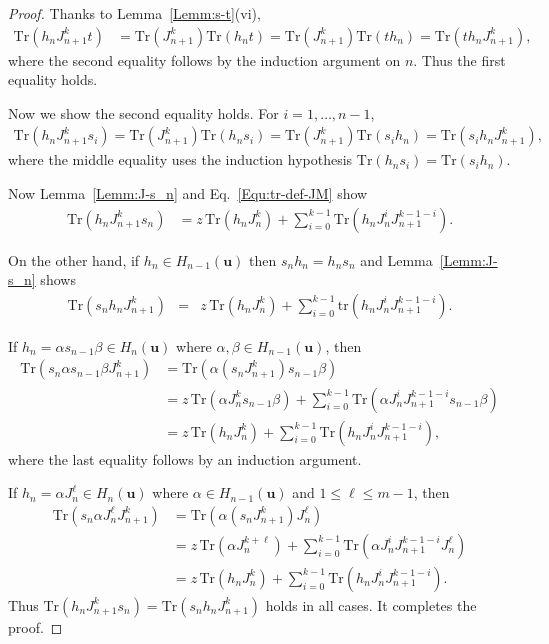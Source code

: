 \documentclass[a4paper, oneside]{amsart}
\numberwithin{equation}{section}
\theoremstyle{definition}
\theoremstyle{remark}
\begin{document}
\begin{proof}Thanks to Lemma~\ref{Lemm:s-t}(vi),
\begin{align*}
\mathrm{Tr}(h_{n}J_{n+1}^kt)&=\mathrm{Tr}(J_{n+1}^k)\mathrm{Tr}(h_{n}t)=\mathrm{Tr}(J_{n+1}^k)
\mathrm{Tr}(th_{n})=\mathrm{Tr}(th_{n}J_{n+1}^k),
\end{align*}
where the second equality follows by the induction argument on $n$.  Thus  the first equality holds.

Now we show the second equality holds.
For  $i=1, \ldots, n-1$,  \begin{align*}
\mathrm{Tr}(h_{n}J_{n+1}^ks_i)=\mathrm{Tr}(J_{n+1}^k)\mathrm{Tr}(h_{n}s_i)
=\mathrm{Tr}(J_{n+1}^k)\mathrm{Tr}(s_ih_{n})
=\mathrm{Tr}(s_ih_{n}J_{n+1}^k),
\end{align*}
where the middle equality uses the induction hypothesis $\mathrm{Tr}(h_{n}s_i)=\mathrm{Tr}(s_ih_{n})$.

Now Lemma~\ref{Lemm:J-s_n} and Eq.~\eqref{Equ:tr-def-JM} show
\begin{align*}
\mathrm{Tr}(h_{n}J_{n+1}^ks_n)&=z\,\mathrm{Tr}(h_{n}J_n^{k})+
\sum_{i=0}^{k-1}\mathrm{Tr}(h_nJ_{n}^iJ_{n+1}^{k-1-i}).
\end{align*}

On the other hand,  if $h_{n}\in H_{n-1}(\boldsymbol{u})$ then $s_nh_n=h_ns_n$ and Lemma~\ref{Lemm:J-s_n} shows \begin{eqnarray*}
\mathrm{Tr}(s_nh_{n}J_{n+1}^k)&=&z\,\mathrm{Tr}(h_{n}J_n^{k})+
\sum_{i=0}^{k-1}\mathrm{tr}(h_nJ_{n}^iJ_{n+1}^{k-1-i}).
\end{eqnarray*}

If $h_{n}=\alpha s_{n-1}\beta\in H_{n}(\boldsymbol{u})$ where $\alpha,\beta\in H_{n-1}(\boldsymbol{u})$, then
\begin{align*}\mathrm{Tr}(s_n\alpha s_{n-1}\beta J_{n+1}^k)
&=\mathrm{Tr}(\alpha (s_n J_{n+1}^k)s_{n-1}\beta)\\
&=z\,\mathrm{Tr}(\alpha J_n^{k}s_{n-1}\beta)+
\sum_{i=0}^{k-1}\mathrm{Tr}(\alpha J_{n}^iJ_{n+1}^{k-1-i}s_{n-1}\beta)\\
&=z\,\mathrm{Tr}(h_{n}J_n^{k})+
\sum_{i=0}^{k-1}\mathrm{Tr}(h_nJ_{n}^iJ_{n+1}^{k-1-i}),
\end{align*}
where the last equality follows by an induction argument.

If $h_{n}=\alpha J_{n}^{\ell}\in H_{n}(\boldsymbol{u})$ where $\alpha\in H_{n-1}(\boldsymbol{u})$ and $1\leq \ell\leq m-1$, then
\begin{align*}
\mathrm{Tr}(s_n\alpha J_n^{\ell} J_{n+1}^k)&=\mathrm{Tr}(\alpha (s_n J_{n+1}^k)J_n^{\ell})\\
&=z\,\mathrm{Tr}(\alpha J_n^{k+\ell})+\sum_{i=0}^{k-1}\mathrm{Tr}(\alpha J_{n}^iJ_{n+1}^{k-1-i}J_n^{\ell})\\
&=z\,\mathrm{Tr}(h_{n}J_n^{k})+
\sum_{i=0}^{k-1}\mathrm{Tr}(h_nJ_{n}^iJ_{n+1}^{k-1-i}).
\end{align*}
Thus $\mathrm{Tr}(h_{n}J_{n+1}^ks_n)=\mathrm{Tr}(s_nh_{n}J_{n+1}^k)$ holds in all cases.  It completes the proof.
\end{proof}
\end{document}

